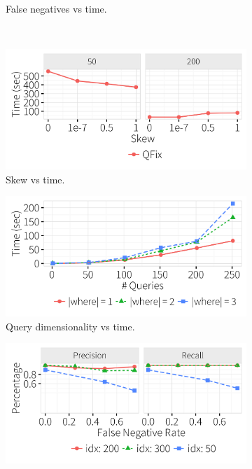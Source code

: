 \begin{figure}[h]
\begin{subfigure}[t]{.33\textwidth}
      \vspace*{-.25in}
      \caption{False negatives vs time.}
      \label{f:falsenegative_time} 
    \end{subfigure} 
    \\
    \hspace*{-.1in}
    \vspace*{.2in}
    \begin{subfigure}[t]{.33\textwidth}
      \includegraphics[width = .99\columnwidth]{figures/skew_time}
      \vspace*{-.25in}
      \caption{Skew vs time.}
      \label{f:skew_time} 
    \end{subfigure}
    \begin{subfigure}[t]{.33\textwidth}
      \includegraphics[width = .99\columnwidth]{figures/where_time}
      \vspace*{-.25in}
      \caption{Query dimensionality vs time.}
      \label{f:where_time} 
    \end{subfigure}
    \begin{subfigure}[t]{.33\textwidth}
      \includegraphics[width = .99\columnwidth]{figures/noise_fn_acc}

\end{subfigure}
\end{figure}
